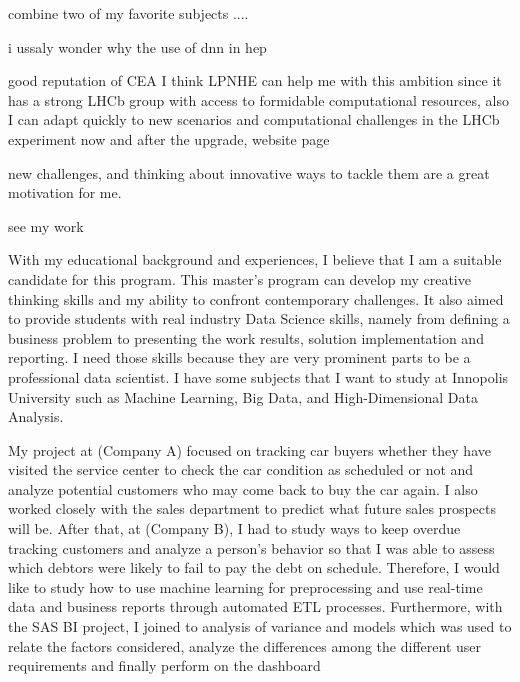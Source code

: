 \begin{cvletter}
combine two of my favorite subjects ....


i ussaly wonder why the use of dnn in hep



good reputation of CEA 
I think LPNHE can help me with this ambition since it has a strong LHCb group with access to formidable computational resources, also I can adapt quickly to new scenarios and computational challenges in the LHCb experiment now and after the upgrade, 
website page

new challenges, and thinking about innovative ways to tackle them are a great motivation for me.

 see my work


With my educational background and experiences, I believe that I am a suitable candidate for this program. This master's program can develop my creative thinking skills and my ability to confront contemporary challenges. It also aimed to provide students with real industry Data Science skills, namely from defining a business problem to presenting the work results, solution implementation and reporting. I need those skills because they are very prominent parts to be a professional data scientist. I have some subjects that I want to study at Innopolis University such as Machine Learning, Big Data, and High-Dimensional Data Analysis.



 My project at (Company A) focused on tracking car buyers whether they have visited the service center to check the car condition as scheduled or not and analyze potential customers who may come back to buy the car again. I also worked closely with the sales department to predict what future sales prospects will be. After that, at (Company B), I had to study ways to keep overdue tracking customers and analyze a person's behavior so that I was able to assess which debtors were likely to fail to pay the debt on schedule. Therefore, I would like to study how to use machine learning for preprocessing and use real-time data and business reports through automated ETL processes. Furthermore, with the SAS BI project, I joined to analysis of variance and models which was used to relate the factors considered, analyze the differences among the different user requirements and finally perform on the dashboard



\end{cvletter}
